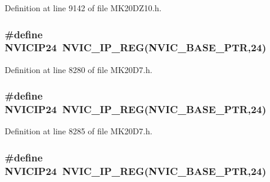 Definition at line 9142 of file M\+K20\+D\+Z10.\+h.

\subsubsection[{\texorpdfstring{N\+V\+I\+C\+I\+P24}{NVICIP24}}]{\setlength{\rightskip}{0pt plus 5cm}\#define N\+V\+I\+C\+I\+P24~{\bf N\+V\+I\+C\+\_\+\+I\+P\+\_\+\+R\+EG}({\bf N\+V\+I\+C\+\_\+\+B\+A\+S\+E\+\_\+\+P\+TR},24)}\hypertarget{group___n_v_i_c___register___accessor___macros_gab38274ebd4a3bdfefc68d97d8fabbac7}{}\label{group___n_v_i_c___register___accessor___macros_gab38274ebd4a3bdfefc68d97d8fabbac7}


Definition at line 8280 of file M\+K20\+D7.\+h.

\subsubsection[{\texorpdfstring{N\+V\+I\+C\+I\+P24}{NVICIP24}}]{\setlength{\rightskip}{0pt plus 5cm}\#define N\+V\+I\+C\+I\+P24~{\bf N\+V\+I\+C\+\_\+\+I\+P\+\_\+\+R\+EG}({\bf N\+V\+I\+C\+\_\+\+B\+A\+S\+E\+\_\+\+P\+TR},24)}\hypertarget{group___n_v_i_c___register___accessor___macros_gab38274ebd4a3bdfefc68d97d8fabbac7}{}\label{group___n_v_i_c___register___accessor___macros_gab38274ebd4a3bdfefc68d97d8fabbac7}


Definition at line 8285 of file M\+K20\+D7.\+h.

\subsubsection[{\texorpdfstring{N\+V\+I\+C\+I\+P24}{NVICIP24}}]{\setlength{\rightskip}{0pt plus 5cm}\#define N\+V\+I\+C\+I\+P24~{\bf N\+V\+I\+C\+\_\+\+I\+P\+\_\+\+R\+EG}({\bf N\+V\+I\+C\+\_\+\+B\+A\+S\+E\+\_\+\+P\+TR},24)}\hypertarget{group___n_v_i_c___register___accessor___macros_gab38274ebd4a3bdfefc68d97d8fabbac7}{}\label{group___n_v_i_c___register___accessor___macros_gab38274ebd4a3bdfefc68d97d8fabbac7}


